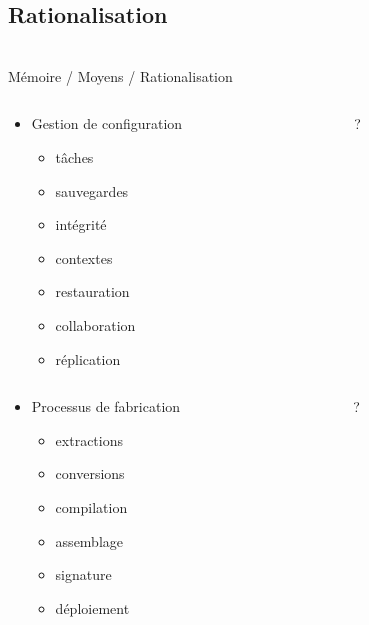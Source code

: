 \subsection{Rationalisation}\begin{frame}
{\bititle\\Mémoire / Moyens / Rationalisation}
\begin{columns}\begin{column}{.5\textwidth}
\begin{itemize}
\item<1-> Gestion de configuration
    \begin{itemize}
    \item<2-> tâches
    \item<3-> sauvegardes
    \item<4-> intégrité
    \item<5-> contextes
    \item<6-> restauration
    \item<7-> collaboration
    \item<8-> réplication
    \end{itemize}
\end{itemize}
\end{column}\begin{column}{.5\textwidth}
?
\end{column}\end{columns}
\begin{columns}\begin{column}{.5\textwidth}
\begin{itemize}
\item<9-> Processus de fabrication
    \begin{itemize}
    \item<10-> extractions
    \item<11-> conversions
    \item<12-> compilation
    \item<13-> assemblage
    \item<14-> signature
    \item<15-> déploiement
    \end{itemize}
\end{itemize}
\end{column}\begin{column}{.5\textwidth}
?
\end{column}\end{columns}
\end{frame}
